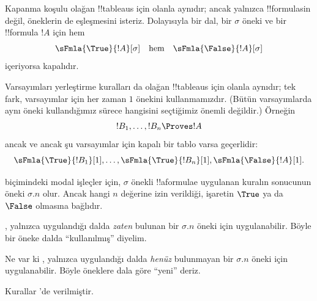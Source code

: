\documentclass[../../../include/open-logic-section]{subfiles}
\begin{document}
Kapanma koşulu olağan !!{tableau}s için olanla aynıdır; ancak yalnızca
!!{formula}s{}in değil, öneklerin de eşleşmesini isteriz. Dolayısıyla bir dal,
bir $\sigma$ öneki ve bir !!{formula} $!A$ için hem
\[
\sFmla{\True}{!A}[\sigma] \quad\text{hem}\quad \sFmla{\False}{!A}[\sigma]
\]
içeriyorsa kapalıdır.

Varsayımları yerleştirme kuralları da olağan !!{tableau}s için olanla aynıdır;
tek fark, varsayımlar için her zaman $1$ önekini kullanmamızdır. (Bütün
varsayımlarda aynı öneki kullandığımız sürece hangisini seçtiğimiz önemli
değildir.) Örneğin
\[
!B_1, \dots, !B_n \Proves !A
\]
ancak ve ancak şu varsayımlar için kapalı bir tablo varsa geçerlidir:
\[
\sFmla{\True}{!B_1}[1], \dots, \sFmla{\True}{!B_n}[1],
\sFmla{\False}{!A}[1].
\]

 biçimindeki modal işleçler için,
$\sigma$ önekli !!a{formula}{}e uygulanan kuralın sonucunun öneki $\sigma.n$
olur. Ancak hangi $n$ değerine izin verildiği, işaretin $\True$ ya da
$\False$ olmasına bağlıdır.

, yalnızca uygulandığı
dalda \emph{zaten} bulunan bir $\sigma.n$ öneki için uygulanabilir. Böyle bir
öneke dalda ``kullanılmış'' diyelim.

Ne var ki , yalnızca
uygulandığı dalda \emph{henüz} bulunmayan bir $\sigma.n$ öneki için
uygulanabilir. Böyle öneklere dala göre ``yeni'' deriz.

Kurallar 'de verilmiştir.
\end{document}

